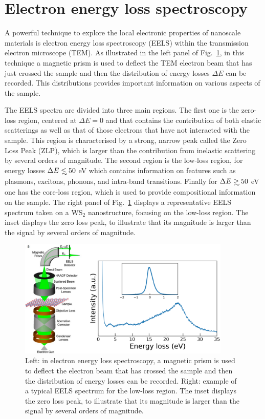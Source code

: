 \section{Electron energy loss spectroscopy}
\label{sec:eels}

A powerful technique to explore the local electronic properties
of nanoscale materials is electron energy loss spectroscopy (EELS)
within the transmission electron microscope (TEM).
%
As illustrated in the left panel of Fig.~\ref{fig:EELS},
in this technique a magnetic
prism is used to deflect the TEM
electron beam that has just crossed the sample
and then the distribution of energy losses $\Delta E$ can be recorded.
%
This distributions provides important information on various
aspects of the sample.

The EELS spectra are divided into three main regions.
%
The first one is the zero-loss region, centered at $\Delta E=0$
and that contains the contribution of both elastic scatterings
as well as that of those electrons that have not interacted with the
sample.
%
This region is characterised by a strong, narrow peak called
the Zero Loss Peak (ZLP), which is larger than the contribution
from inelastic scattering by several orders of magnitude.
%
The second region is the low-loss region, for energy losses
$\Delta E \lsim 50$ eV which contains information
on features such as plasmons, excitons, phonons, and
intra-band transitions.
%
Finally for $\Delta E \gsim 50$ eV one has the core-loss region,
which is used to provide compositional information
on the sample.
%
The right panel of Fig.~\ref{fig:EELS} displays
a representative EELS spectrum taken on a WS$_2$ nanostructure,
focusing on the low-loss region.
%
 The inset displays the zero loss peak, to illustrate that
 its magnitude is larger than the signal by several
 orders of magnitude.
 
\begin{figure}[H]
    \centering
    \includegraphics[width=0.9\textwidth]{plots/EELS.pdf}
    \caption{Left: in electron energy loss spectroscopy, a magnetic
      prism is used to deflect the electron beam that has crossed the sample
      and then the distribution of energy losses can be recorded.
      Right: example of a typical EELS spectrum for the low-loss
      region.
      The inset displays the zero loss peak, to illustrate that
      its magnitude is larger than the signal by several
      orders of magnitude.
      }
    \label{fig:EELS}
\end{figure}
